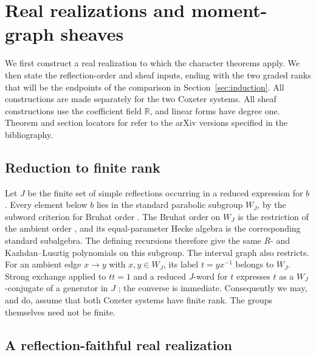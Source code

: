 \section{Real realizations and moment-graph sheaves}
\label{sec:background}

We first construct a real realization to which the character theorems apply.
We then state the reflection-order and sheaf inputs, ending with the two graded ranks
that will be the endpoints of the comparison in Section~\ref{sec:induction}.
All constructions are made separately for the two Coxeter systems.
All sheaf constructions use the coefficient field $\mathbb R$, and
linear forms have degree one.
Theorem and section locators for \cite{Fiebig08,EW14} refer to the
arXiv versions specified in the bibliography.

\subsection{Reduction to finite rank}

Let $J$ be the finite set of simple reflections occurring in a reduced
expression for $b$. Every element below $b$ lies in the standard parabolic
subgroup $W_J$, by the subword criterion for Bruhat order
\cite[Theorem~2.2.2]{BB05}. The Bruhat order on $W_J$ is the restriction of
the ambient order \cite[Proposition~2.4.1]{BB05}, and its equal-parameter
Hecke algebra is the corresponding standard subalgebra. The defining
recursions therefore give the same $R$- and Kazhdan--Lusztig polynomials on
this subgroup. The interval graph also restricts. For an ambient edge
$x\to y$ with $x,y\in W_J$, its label $t=yx^{-1}$ belongs to $W_J$.
Strong exchange applied to $tt=1$ and a reduced $J$-word for $t$ expresses
$t$ as a $W_J$-conjugate of a generator in $J$
\cite[Corollary~1.4.4]{BB05}; the converse is immediate.
Consequently we may, and do,
assume that both Coxeter systems have finite rank.  The groups themselves
need not be finite.

\subsection{A reflection-faithful real realization}

